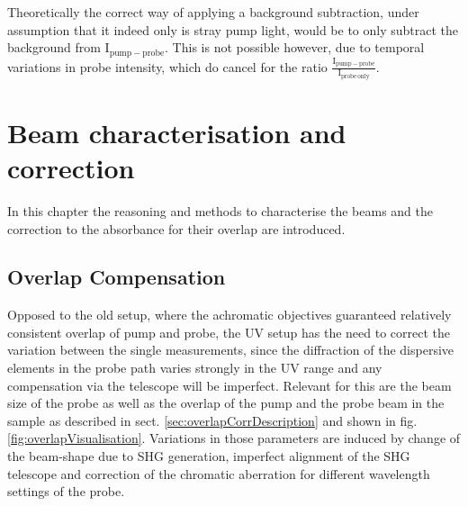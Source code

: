 \documentclass[twoside,openright]{scrreprt}
\begin{document}
Theoretically the correct way of applying a background subtraction, under assumption that it indeed only is stray pump light, would be to only subtract the background from $\mathrm{I_{pump-probe}}$. This is not possible however, due to temporal variations in probe intensity, which do cancel for the ratio $\mathrm{\frac{I_{pump-probe}}{I_{probe\, only}}}$.



\chapter{Beam characterisation and correction}\label{chp:OverlapCorrection}
In this chapter the reasoning and methods to characterise the beams and the correction to the absorbance for their overlap are introduced.
\section{Overlap Compensation}
Opposed to the old setup, where the achromatic objectives guaranteed relatively consistent overlap of pump and probe, the UV setup has the need to correct the variation between the single measurements, since the diffraction of the dispersive elements in the probe path varies strongly in the UV range and any compensation via the telescope will be imperfect.\newline
Relevant for this are the beam size of the probe as well as the overlap of the pump and the probe beam in the sample as described in sect. \ref{sec:overlapCorrDescription} and shown in fig. \ref{fig:overlapVisualisation}. Variations in those parameters are induced by change of the beam-shape due to SHG generation, imperfect alignment of the SHG telescope and correction of the chromatic aberration for different wavelength settings of the probe.\newline
\end{document}
